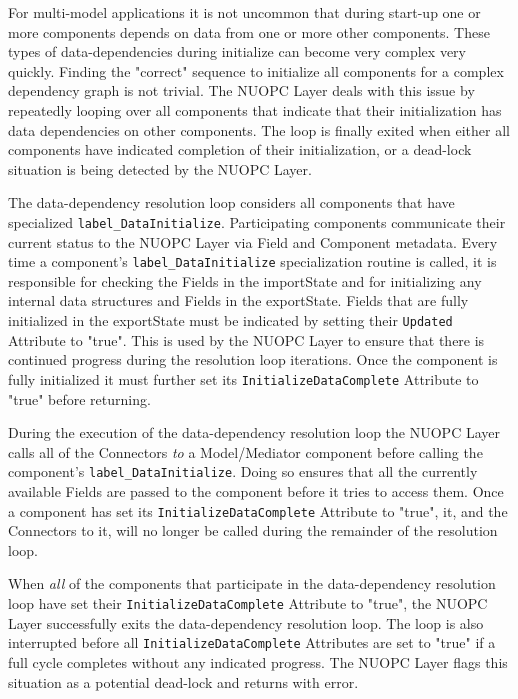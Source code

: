 %

\label{DataDepInit}

For multi-model applications it is not uncommon that during start-up one or more components depends on data from one or more other components. These types of data-dependencies during initialize can become very complex very quickly. Finding the "correct" sequence to initialize all components for a complex dependency graph is not trivial. The NUOPC Layer deals with this issue by repeatedly looping over all components that indicate that their initialization has data dependencies on other components. The loop is finally exited when either all components have indicated completion of their initialization, or a dead-lock situation is being detected by the NUOPC Layer.

The data-dependency resolution loop considers all components that have specialized {\tt label\_DataInitialize}. Participating components communicate their current status to the NUOPC Layer via Field and Component metadata. Every time a component's {\tt label\_DataInitialize} specialization routine is called, it is responsible for checking the Fields in the importState and for initializing any internal data structures and Fields in the exportState. Fields that are fully initialized in the exportState must be indicated by setting their {\tt Updated} Attribute to "true". This is used by the NUOPC Layer to ensure that there is continued progress during the resolution loop iterations. Once the component is fully initialized it must further set its {\tt InitializeDataComplete} Attribute to "true" before returning.

During the execution of the data-dependency resolution loop the NUOPC Layer calls all of the Connectors {\em to} a Model/Mediator component before calling the component's {\tt label\_DataInitialize}. Doing so ensures that all the currently available Fields are passed to the component before it tries to access them. Once a component has set its {\tt InitializeDataComplete} Attribute to "true", it, and the Connectors to it, will no longer be called during the remainder of the resolution loop. 

When {\em all} of the components that participate in the data-dependency resolution loop have set their {\tt InitializeDataComplete} Attribute to "true", the NUOPC Layer successfully exits the data-dependency resolution loop. The loop is also interrupted before all {\tt InitializeDataComplete} Attributes are set to "true" if a full cycle completes without any indicated progress. The NUOPC Layer flags this situation as a potential dead-lock and returns with error.
